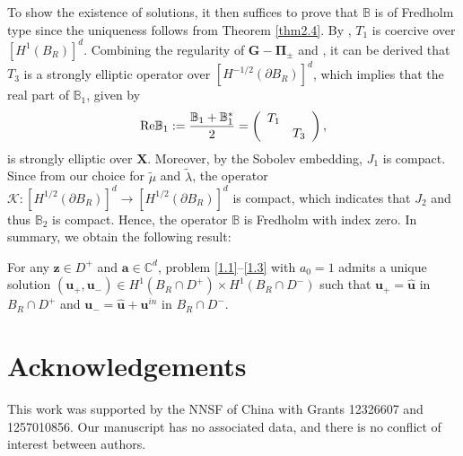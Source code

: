 \documentclass[final,reqno]{siamltex}
\newcommand{\pa}{\partial}
\newcommand{\Rt}{{\rm Re}}
\newcommand{\mat}{\mathbb}
\newcommand{\C}{{\mat C}}
\newtheorem{remark}[theorem]{Remark}
\begin{document}
To show the existence of solutions, it then suffices to prove that $\mathbb{B}$ is of Fredholm type since the uniqueness follows from Theorem \ref{thm2.4}. By \cite[Lemma 3.2]{GXY18}, $T_1$ is coercive over $[H^1(B_R)]^d$. Combining the regularity of $\mathbf{G}-\boldsymbol{\Pi}_\pm$ and \cite[Theorem 7.6]{WM10}, it can be derived that $T_3$ is a strongly elliptic operator over $[H^{-1/2}(\pa B_R)]^d$, which implies that the real part of $\mathbb{B}_1$, given by 
\begin{align*}
\Rt\mathbb{B}_1:=\frac{\mathbb{B}_1+\mathbb{B}_1^*}{2}=
\left(
\begin{array}{cc}
	T_1 &  \\
	  & T_3 
\end{array}
\right), 
\end{align*}
is strongly elliptic over $\mathbf{X}$. Moreover, by the Sobolev embedding, $J_1$ is compact. Since from our choice for $\tilde{\mu}$ and $\tilde{\lambda}$, the operator $\mathcal{K}:[H^{1/2}(\pa B_R)]^d\rightarrow[H^{1/2}(\pa B_R)]^d$ is compact, which indicates that $J_2$ and thus $\mathbb{B}_2$ is compact. Hence, the operator $\mathbb{B}$ is Fredholm with index zero. In summary, we obtain the following result: 
\begin{theorem}\label{thm4.1}
	For any $\mathbf{z}\in D^+$ and $\mathbf{a}\in\C^d$, problem \eqref{1.1}--\eqref{1.3} with $a_0=1$ admits a unique solution $(\mathbf{u}_+,\mathbf{u}_-)\in H^1(B_R\cap D^+)\times H^1(B_R\cap D^-)$ such that $\mathbf{u}_+=\mathbf{\hat u}$ in $B_R\cap D^+$ and $\mathbf{u}_-=\mathbf{\hat u}+\mathbf{u}^{in}$ in $B_R\cap D^-$. 
\end{theorem}









\section*{Acknowledgements}
This work was supported by the NNSF of China with Grants 12326607 and 1257010856. 
Our manuscript has no associated data, and there is no conflict of interest between authors. 
\end{document}
